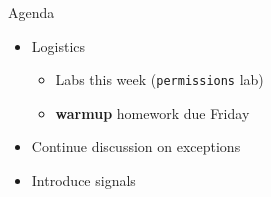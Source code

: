 \begin{frame}{Agenda}
    \begin{itemize}
        \item Logistics
            \begin{itemize}
            \item Labs this week (\texttt{permissions} lab)
            \item \textbf{warmup} homework due Friday
            \end{itemize}
        \item Continue discussion on exceptions
        \item Introduce signals
    \end{itemize}
\end{frame}